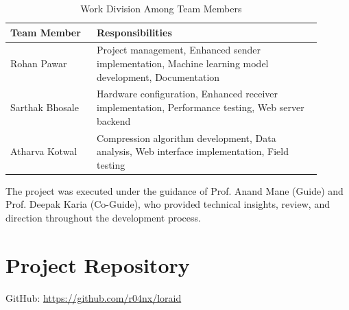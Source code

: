 \documentclass[conference]{IEEEtran}
\begin{document}
\begin{table}[htbp]
\caption{Work Division Among Team Members}
\label{tab:work_division}
\begin{center}
\begin{tabular}{|p{0.25\linewidth}|p{0.65\linewidth}|}
\hline
\textbf{Team Member} & \textbf{Responsibilities} \\
\hline
Rohan Pawar & Project management, Enhanced sender implementation, Machine learning model development, Documentation \\
\hline
Sarthak Bhosale & Hardware configuration, Enhanced receiver implementation, Performance testing, Web server backend \\
\hline
Atharva Kotwal & Compression algorithm development, Data analysis, Web interface implementation, Field testing \\
\hline
\end{tabular}
\end{center}
\end{table}

The project was executed under the guidance of Prof. Anand Mane (Guide) and Prof. Deepak Karia (Co-Guide), who provided technical insights, review, and direction throughout the development process.

\section*{Project Repository}
GitHub: \url{https://github.com/r04nx/loraid}
\end{document}
